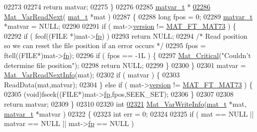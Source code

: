 \begin{DoxyCode}
{{{{{{{{{{{{{{{{{{{{{{{{{{{{{{{{{{{{{{{{{{{02273 
02274     \textcolor{keywordflow}{return} matvar;
02275 \}
02276 
02285 \hyperlink{group___m_a_t_structmatvar__t}{matvar\_t} *
\hyperlink{group___m_a_t_ga7c321d6aafd93916ba6c5655ad78e9ca}{02286} \hyperlink{group___m_a_t_ga7c321d6aafd93916ba6c5655ad78e9ca}{Mat\_VarReadNext}( \hyperlink{struct__mat__t}{mat\_t} *mat )
02287 \{
02288     \textcolor{keywordtype}{long} fpos = 0;
02289     \hyperlink{group___m_a_t_structmatvar__t}{matvar\_t} *matvar = NULL;
02290 
02291     \textcolor{keywordflow}{if} ( mat->\hyperlink{struct__mat__t_a729c2bc0afc97485057a5af425635b1a}{version} != \hyperlink{group___m_a_t_ggad03442b8378999189d510e3745c702b7a765c5d1d5038947646260dc82483517e}{MAT\_FT\_MAT73} ) \{
02292         \textcolor{keywordflow}{if} ( feof((FILE *)mat->\hyperlink{struct__mat__t_a85f562e407ca9ad4d2a6e14f839432b7}{fp}) )
02293             \textcolor{keywordflow}{return} NULL;
02294         \textcolor{comment}{/* Read position so we can reset the file position if an error occurs */}
02295         fpos = ftell((FILE*)mat->\hyperlink{struct__mat__t_a85f562e407ca9ad4d2a6e14f839432b7}{fp});
02296         \textcolor{keywordflow}{if} ( fpos == -1L ) \{
02297             \hyperlink{group__mat__util_gaf51f2bfbb5580f575e4dd79757e2b80c}{Mat\_Critical}(\textcolor{stringliteral}{"Couldn't determine file position"});
02298             \textcolor{keywordflow}{return} NULL;
02299         \}
02300     \}
02301     matvar = \hyperlink{group___m_a_t_ga72dd99330507b17177e22f9ed3bea5e6}{Mat\_VarReadNextInfo}(mat);
02302     \textcolor{keywordflow}{if} ( matvar ) \{
02303         ReadData(mat,matvar);
02304     \} \textcolor{keywordflow}{else} \textcolor{keywordflow}{if} ( mat->\hyperlink{struct__mat__t_a729c2bc0afc97485057a5af425635b1a}{version} != \hyperlink{group___m_a_t_ggad03442b8378999189d510e3745c702b7a765c5d1d5038947646260dc82483517e}{MAT\_FT\_MAT73} ) \{
02305         (void)fseek((FILE*)mat->\hyperlink{struct__mat__t_a85f562e407ca9ad4d2a6e14f839432b7}{fp},fpos,SEEK\_SET);
02306     \}
02307 
02308     \textcolor{keywordflow}{return} matvar;
02309 \}
02310 
02320 \textcolor{keywordtype}{int}
\hyperlink{group___m_a_t_ga1ae164415dfd98cdf48ad07033b6e0bb}{02321} \hyperlink{group___m_a_t_ga1ae164415dfd98cdf48ad07033b6e0bb}{Mat\_VarWriteInfo}(\hyperlink{struct__mat__t}{mat\_t} *mat, \hyperlink{group___m_a_t_structmatvar__t}{matvar\_t} *matvar )
02322 \{
02323     \textcolor{keywordtype}{int} err = 0;
02324 
02325     \textcolor{keywordflow}{if} ( mat == NULL || matvar == NULL || mat->\hyperlink{struct__mat__t_a85f562e407ca9ad4d2a6e14f839432b7}{fp} == NULL )
}}}}}}}}}}}}}}}}}}}}}}}}}}}}}}}}}}}}}}}}}}}
\end{DoxyCode}
